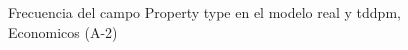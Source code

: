 \begin{figure}[H]
    \centering
    
    \caption{Frecuencia del campo Property type en el modelo real y tddpm, Economicos (A-2)}
    \label{frecuency-Property Type-tddpm_mlp}
\end{figure}